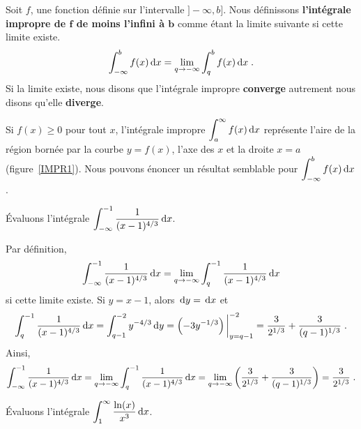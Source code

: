 {\begin{focus}{\dfn}
Soit $f$, une fonction définie sur l'intervalle $]-\infty, b]$. Nous
définissons {\bfseries l'intégrale impropre de $\mathbf f$ de moins
l'infini à $\mathbf b$} comme étant la limite suivante si cette limite
existe.
\[
\int_{-\infty}^b f(x) \,\mathrm{d}x = \lim_{q\rightarrow -\infty} \int_q^b f(x)\,\mathrm{d}x \; .
\]
Si la limite existe, nous disons que l'intégrale impropre
{\bfseries converge} autrement nous disons qu'elle {\bfseries diverge}.
\end{focus}

Si $f(x)\geq 0$ pour tout $x$, l'intégrale impropre
$\displaystyle \int_a^\infty f(x) \,\mathrm{d}x$ représente l'aire de la
région bornée par la courbe $y=f(x)$, l'axe des $x$ et la droite $x=a$
(figure~\ref{IMPR1}).  Nous pouvons énoncer un
résultat semblable pour $\displaystyle \int_{-\infty}^b f(x) \,\mathrm{d}x$.


\begin{egg}
Évaluons l'intégrale
$\displaystyle \int_{-\infty}^{-1} \frac{1}{(x-1)^{4/3}} \,\mathrm{d}x$.

Par définition,
\[
\int_{-\infty}^{-1} \frac{1}{(x-1)^{4/3}} \,\mathrm{d}x =
\lim_{q\rightarrow -\infty} \int_q^{-1} \frac{1}{(x-1)^{4/3}} \,\mathrm{d}x
\]
si cette limite existe.  Si $y=x-1$, alors $\,\mathrm{d}y = \,\mathrm{d}x$ et
\[
\int_q^{-1} \frac{1}{(x-1)^{4/3}} \,\mathrm{d}x = \int_{q-1}^{-2} y^{-4/3} \,\mathrm{d}y
= \left( -3 y^{-1/3} \right)\bigg|_{y=q-1}^{-2}
= \frac{3}{2^{1/3}} + \frac{3}{(q-1)^{1/3}} \; .
\]
Ainsi,
\[
\int_{-\infty}^{-1} \frac{1}{(x-1)^{4/3}} \,\mathrm{d}x
=\lim_{q\rightarrow -\infty} \int_q^{-1} \frac{1}{(x-1)^{4/3}} \,\mathrm{d}x
=\lim_{q\rightarrow -\infty} \left(\frac{3}{2^{1/3}}
+ \frac{3}{(q-1)^{1/3}} \right)
= \frac{3}{2^{1/3}} \; .
\]
\end{egg}

\begin{egg}
Évaluons l'intégrale
$\displaystyle \int_1^\infty \frac{\ln(x)}{x^3} \,\mathrm{d}x$.


\end{egg}}
